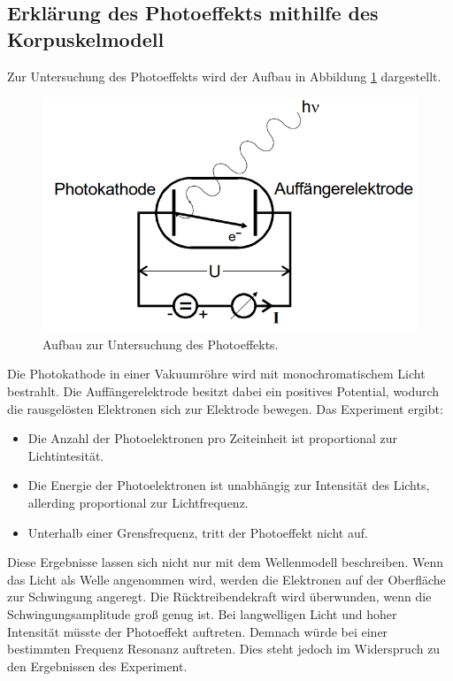 \subsection{Erklärung des Photoeffekts mithilfe des Korpuskelmodell}
Zur Untersuchung des Photoeffekts wird der Aufbau in Abbildung \ref{fig:phauf} dargestellt.
\begin{figure}
    \centering
    \includegraphics[scale=0.5]{content/PhoUnt.png}
    \caption{Aufbau zur Untersuchung des Photoeffekts.\cite{sample}}
    \label{fig:phauf}
\end{figure}
Die Photokathode in einer Vakuumröhre wird mit monochromatischem Licht bestrahlt.
Die Auffängerelektrode besitzt dabei ein positives Potential, wodurch die rausgelösten Elektronen sich zur Elektrode bewegen.
Das Experiment ergibt:
\begin{itemize}
    \item Die Anzahl der Photoelektronen pro Zeiteinheit ist proportional zur Lichtintesität. 
    \item Die Energie der Photoelektronen ist unabhängig zur Intensität des Lichts, allerding proportional zur Lichtfrequenz.
    \item Unterhalb einer Grensfrequenz, tritt der Photoeffekt nicht auf.
\end{itemize}   
Diese Ergebnisse lassen sich nicht nur mit dem Wellenmodell beschreiben.
Wenn das Licht als Welle angenommen wird, werden die Elektronen auf der Oberfläche zur Schwingung angeregt.
Die Rücktreibendekraft wird überwunden, wenn die Schwingungsamplitude groß genug ist.
Bei langwelligen Licht und hoher Intensität müsste der Photoeffekt auftreten.
Demnach würde bei einer bestimmten Frequenz Resonanz auftreten.
Dies steht jedoch im Widerspruch zu den Ergebnissen des Experiment.
